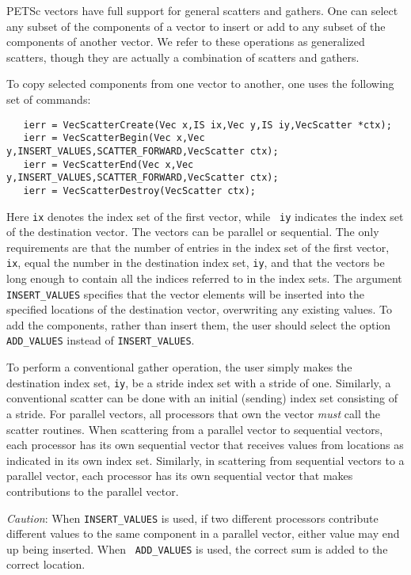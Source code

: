 PETSc vectors have full support for general scatters and 
gathers. One can select any subset of the components of a vector to
insert or add to any subset of the components of another vector.
We refer to these operations as generalized scatters, though they are 
actually a combination of scatters and gathers. 

 
 
 
To copy selected components from one vector 
to another, one uses the following set of commands:
\begin{verbatim}
   ierr = VecScatterCreate(Vec x,IS ix,Vec y,IS iy,VecScatter *ctx);
   ierr = VecScatterBegin(Vec x,Vec y,INSERT_VALUES,SCATTER_FORWARD,VecScatter ctx);
   ierr = VecScatterEnd(Vec x,Vec y,INSERT_VALUES,SCATTER_FORWARD,VecScatter ctx);
   ierr = VecScatterDestroy(VecScatter ctx);
\end{verbatim} 
Here {\tt ix} denotes the index set of the first vector, while {\tt
iy} indicates the index set of the destination vector.  The vectors
can be parallel or sequential. The only requirements are that the
number of entries in the index set of the first vector, {\tt ix},
equal the number in the destination index set, {\tt iy}, and that the
vectors be long enough to contain all the indices referred to in the
index sets.  The argument {\tt INSERT\_VALUES} specifies that the
vector elements will be inserted into the specified locations of the
destination vector, overwriting any existing values.  To add the
components, rather than insert them, the user should select the option
{\tt ADD\_VALUES}  instead of {\tt INSERT\_VALUES}.

To perform a conventional gather operation, the user simply makes
 the destination index set, 
{\tt iy}, be a stride index set with a stride of one.  Similarly, a 
conventional scatter can be done with an initial (sending) index set 
consisting of a stride.  For parallel vectors, all processors that own 
the vector {\em must} call the scatter routines. When scattering from a 
parallel vector to sequential vectors, each processor has its own sequential 
vector that receives values from locations as indicated in its own 
index set. Similarly, in scattering
from sequential vectors to a parallel vector, each processor has its
own sequential vector that makes contributions to the parallel vector.

{\em Caution}: When {\tt INSERT\_VALUES} is used, if two different
processors contribute different values to the same component in a
parallel vector, either value may end up being inserted. When {\tt
ADD\_VALUES} is used, the correct sum is added to the correct
location.

